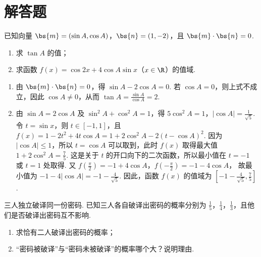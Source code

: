 \section{解答题}

\begin{problem}
已知向量 \(\bs{m} = (\sin A, \cos A)\)，\(\bs{n} = (1, -2)\)，且 \(\bs{m} \cdot \bs{n} = 0\).

\begin{enumerate}
\item 求 \(\tan A\) 的值；
\item 求函数 \(f(x) = \cos 2x + 4\cos A \sin x\)（\(x \in \R\)）的值域.
\end{enumerate}
\end{problem}

\begin{solution}
\begin{enumerate}
\item 由 \(\bs{m} \cdot \bs{n} = 0\)，得
\(\sin A-2\cos A=0\). 若 \(\cos A=0\)，则上式不成立，因此 \(\cos A\neq0\)，从而 \(\tan A=\frac{\sin A}{\cos A}=2\).
\item 由 \(\sin A=2\cos A\) 及 \(\sin ^2A+\cos ^2A=1\)，得
\(5\cos ^2A=1\)，\(\left|\cos A\right|=\frac{1}{\sqrt{5}}\). 令 \(t=\sin x\)，则 \(t\in[-1,1]\)，且 \(f(x)=1-2t^2+4t\cos A=1+2\cos ^2A-2\left(t-\cos A\right)^2\).
因为 \(\left|\cos A\right|\leqslant1\)，所以 \(t=\cos A\) 可以取到，此时 \(f(x)\) 取得最大值
\(1+2\cos ^2A=\frac{7}{5}\).
这是关于 \(t\) 的开口向下的二次函数，所以最小值在 \(t=-1\) 或 \(t=1\) 处取得. 又
\(f\left(\frac{\pi}{2}\right)=-1+4\cos A\)，\(f\left(-\frac{\pi}{2}\right)=-1-4\cos A\)，
故最小值为 \(-1-4\left|\cos A\right|=-1-\frac{4}{\sqrt{5}}\). 因此，函数 \(f(x)\) 的值域为 \(\left[-1-\frac{4}{\sqrt{5}},\frac{7}{5}\right]\).
\end{enumerate}
\end{solution}

\begin{problem}
三人独立破译同一份密码. 已知三人各自破译出密码的概率分别为 \(\frac{1}{5}\)，\(\frac{1}{4}\)，\(\frac{1}{3}\)，且他们是否破译出密码互不影响.

\begin{enumerate}
\item 求恰有二人破译出密码的概率；
\item “密码被破译”与“密码未被破译”的概率哪个大？说明理由.
\end{enumerate}
\end{problem}

